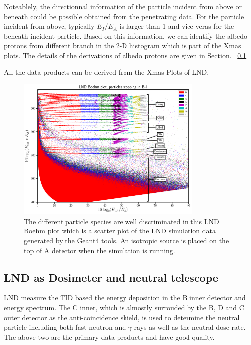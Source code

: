 Noteablely, the directionnal information of the particle incident from above or beneath could be possible obtained from the penetrating data. For the particle incident from above, typically $E_I/E_A$ is larger than 1 and vice veras for the beneath incident particle. 
Based on this information, we can identify the albedo protons from different branch in the 2-D histogram which is part of the Xmas plots.
The details of the derivations of albedo protons are given in Section. ~\ref{}

All the data products can be derived from the Xmas Plots of LND.

\begin{figure}
    \centering
    \includegraphics[width=0.8\textwidth]{images/LND_Boehm_plot_isotropic_on_top_of_A_annotated.png}
    \caption[LND Boehm plot of stopping particles based on the simulated data]{The different particle species are well discriminated in this LND Boehm plot which is a scatter plot of the \ac{LND} simulation data generated by the \ac{Geant4} tools. An isotropic source is placed on the top of A detector when the simulation is running.}
    \label{Fig:LND-Boehm-plot}
\end{figure}


\subsection{LND as Dosimeter and neutral telescope}

\ac{LND} measure the \ac{TID} based the energy deposition in the B inner detector and energy spectrum. The C inner, which is almostly surrouded by the B, D and C outer detector as the anti-coincidence shield, is used to determine the neutral particle including both fast neutron and $\gamma$-rays as well as the neutral dose rate. The above two are the primary data products and have good quality. 

